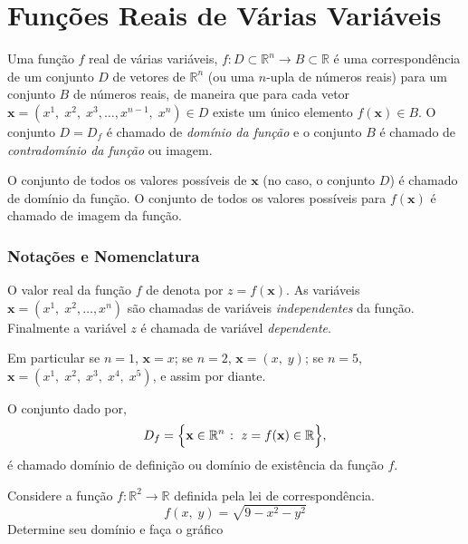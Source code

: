 \chapter{Funções Reais de Várias Variáveis}\label{chap:02}
Uma função $f$ real de várias variáveis, $f\colon D\subset \mathbb{R}^n\to B\subset\mathbb{R}$ é uma correspondência de um conjunto $D$ de vetores de 
$\mathbb{R}^n$ (ou uma \(n\)-upla de números reais) para um conjunto $B$ de números reais, de maneira que para cada vetor $\mathbf{x}=(x^1,\; x^2,\; x^3,\ldots,x^{n-1},\; x^n)\in D$ 
existe um único elemento $f(\mathbf{x})\in B$. O conjunto \(D=D_{f}\) é chamado de \textit{domínio da função} e o conjunto \(B\) é chamado de \textit{contradomínio da função} ou imagem.


O conjunto de todos os valores possíveis de \(\mathbf{x}\) (no caso, o conjunto
\(D\)) é chamado de domínio da função. O conjunto de todos os valores possíveis para \(f(\mathbf{x})\) é chamado de imagem da função.

\subsection{\textcolor[rgb]{0.98,0.00,0.00}{Notações e Nomenclatura}}
%
O valor real da função $f$ de denota por $z=f(\mathbf{x})$. As variáveis $\mathbf{x}=(x^1,\; x^2,\ldots,x^{n})$ são chamadas de variáveis 
\emph{independentes} da função. Finalmente a variável $z$ é chamada de variável \emph{dependente}.

Em particular se \(n=1\), \(\mathbf{x}=x\); se \(n=2\), \(\mathbf{x}=(x,\; y)\); se \(n=5\), \(\mathbf{x}=(x^{1},\; x^{2},\; x^{3},\; x^{4},\; x^{5})\), e assim por diante.

\begin{defi}\label{new01}
	O conjunto dado por,
	\begin{equation*}
		D_{f}=\Bigl\{ \mathbf{x}\in \mathbb{R}^n \; \colon \; z=f(\mathbf{x})\in \mathbb{R} \Bigr\},
	\end{equation*}
	é chamado domínio de definição ou domínio de existência da função $f$.
\end{defi}

\begin{exer}\label{exe:1-1} 
	Considere a função $f\colon \mathbb{R}^2\to \mathbb{R}$ definida pela lei de correspondência.
	\begin{equation*}
		f(x, \;y)=\sqrt{9-x^2-y^2}
	\end{equation*}
	Determine seu domínio e faça o gráfico	
\end{exer}


